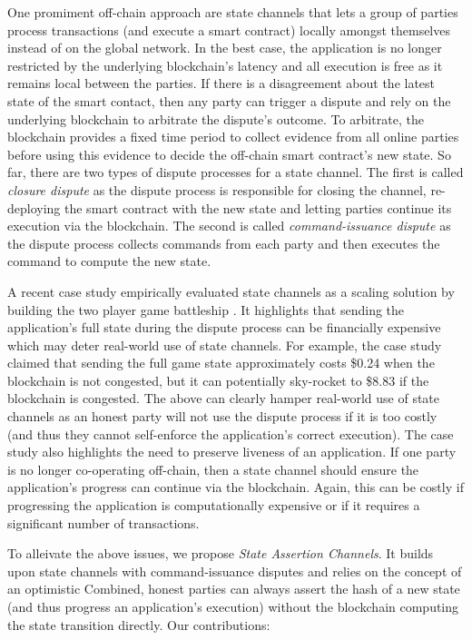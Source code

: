 \documentclass{llncs}
\begin{document}
One promiment off-chain approach are state channels that lets a group of parties process transactions (and execute a smart contract) locally amongst themselves instead of on the global network. 
In the best case, the application is no longer restricted by the underlying blockchain's latency and all execution is free as it remains local between the parties. 
If there is a disagreement about the latest state of the smart contact, then any party can trigger a dispute and rely on the underlying blockchain to arbitrate the dispute's outcome.
To arbitrate, the blockchain provides a fixed time period to collect evidence from all online parties before using this evidence to decide the off-chain smart contract's new state. 
So far, there are two types of dispute processes for a state channel. 
The first is called \emph{closure dispute} \cite{statechannelnetworks,battleship,celernetwork} as the dispute process is responsible for closing the channel, re-deploying the smart contract with the new state and letting parties continue its execution via the blockchain. 
The second is called \emph{command-issuance dispute} \cite{miller2017sprites,mccorry2018pisa,counterfactual,magmo} as the dispute process collects commands from each party and then executes the command to compute the new state. 

A recent case study empirically evaluated state channels as a scaling solution by building the  two player game battleship \cite{battleship}.
It highlights that sending the application's full state during the dispute process can be financially expensive which may deter real-world use of state channels. 
For example, the  case study claimed that sending the full game state approximately costs \$0.24 when the blockchain is not congested, but it can potentially sky-rocket to \$8.83 if the blockchain is congested. 
The above can clearly hamper real-world use of state channels as an honest party will not use the dispute process if it is too costly (and thus they cannot self-enforce the application's correct execution). 
The case study also highlights the need to preserve liveness of an application.
If one party is no longer co-operating off-chain, then a state channel should ensure the application's progress can continue via the blockchain.
Again, this can be costly if progressing the application is computationally expensive or if it requires a significant number of transactions. 

To alleivate the above issues, we propose \emph{State Assertion Channels}.
It builds upon state channels with command-issuance disputes and relies on the concept of an optimistic Combined, honest parties can always assert the hash of a new state (and thus progress an application's execution) without the blockchain computing the state transition directly.
Our contributions: 
\end{document}
